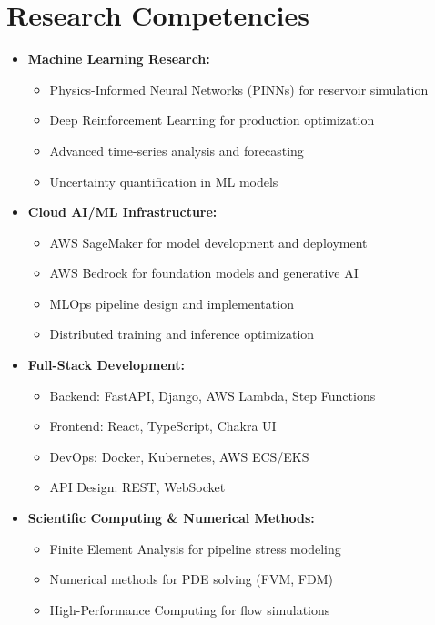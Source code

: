 \documentclass[a4paper,10pt]{article}
\begin{document}
\section*{Research Competencies}
\begin{itemize}[leftmargin=0.5cm]
    \item \textbf{Machine Learning Research:}
        \begin{itemize}
            \item Physics-Informed Neural Networks (PINNs) for reservoir simulation
            \item Deep Reinforcement Learning for production optimization
            \item Advanced time-series analysis and forecasting
            \item Uncertainty quantification in ML models
        \end{itemize}
    \item \textbf{Cloud AI/ML Infrastructure:}
        \begin{itemize}
            \item AWS SageMaker for model development and deployment
            \item AWS Bedrock for foundation models and generative AI
            \item MLOps pipeline design and implementation
            \item Distributed training and inference optimization
        \end{itemize}
    \item \textbf{Full-Stack Development:}
        \begin{itemize}
            \item Backend: FastAPI, Django, AWS Lambda, Step Functions
            \item Frontend: React, TypeScript, Chakra UI
            \item DevOps: Docker, Kubernetes, AWS ECS/EKS
            \item API Design: REST, WebSocket
        \end{itemize}
    \item \textbf{Scientific Computing \& Numerical Methods:}
        \begin{itemize}
            \item Finite Element Analysis for pipeline stress modeling
            \item Numerical methods for PDE solving (FVM, FDM)
            \item High-Performance Computing for flow simulations

\end{itemize}
\end{itemize}
\end{document}
